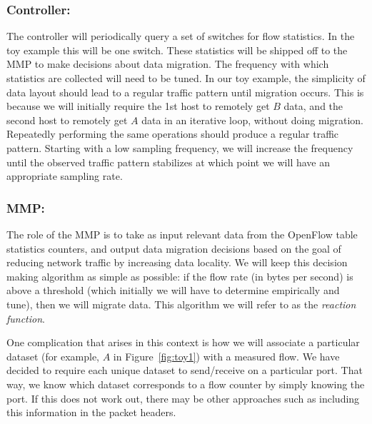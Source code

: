 \documentclass[12pt]{article}
\begin{document}
\subsubsection*{Controller:}
\label{controller}
The controller will periodically query a set of switches for flow statistics. In the toy example this will be one switch.
These statistics will be shipped off to the MMP to make decisions about data migration.  The frequency with 
which statistics are collected will need to be tuned.  In our toy example, the simplicity of data layout should
lead to a regular traffic pattern until migration occurs.  This is because we will initially require the 1st host
to remotely get $B$ data, and the second host to remotely get $A$ data in an iterative loop, without doing migration.
Repeatedly performing the same operations should produce a regular traffic pattern. Starting with a low sampling frequency, 
we will increase the frequency until the observed traffic pattern stabilizes at which point we will have an appropriate 
sampling rate.%


\subsubsection*{MMP:}
\label{mmp}
The role of the MMP is to take as input relevant data from the OpenFlow table statistics counters,
and output data migration decisions based on the goal of reducing network traffic by increasing data 
locality.  We will keep this decision making algorithm as simple as possible: if the flow rate 
(in bytes per second) is above a threshold (which initially we will have to determine empirically and 
tune), then we will migrate data.  This algorithm we will refer to as the \textit{reaction function}.  

One complication that arises in this context is how we will 
associate a particular dataset (for example, $A$ in Figure~\ref{fig:toy1}) with a measured flow.  We have
decided to require each unique dataset to send/receive on a particular port.  That way, we know which
dataset corresponds to a flow counter by simply knowing the port.  If this does not work out, there may
be other approaches such as including this information in the packet headers.
\end{document}
